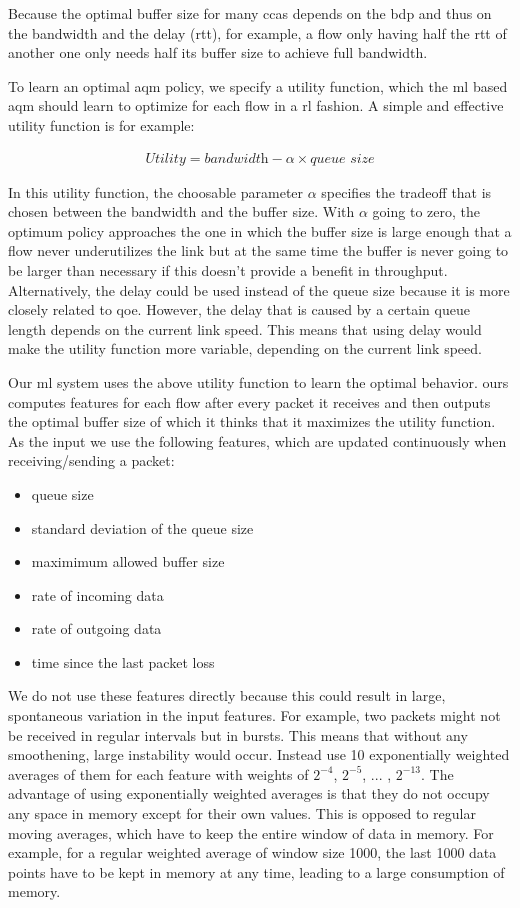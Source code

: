 \documentclass[conference]{IEEEtran}
\begin{document}
Because the optimal buffer size for many \glspl{cca} depends on the \gls{bdp} and thus on the bandwidth and the delay (\gls{rtt}), for example, a flow only having half the \gls{rtt} of another one only needs half its buffer size to achieve full bandwidth. 

To learn an optimal \gls{aqm} policy, we specify a utility function, which the \gls{ml} based \gls{aqm} should learn to optimize for each flow in a \gls{rl} fashion. A simple and effective utility function is for example:

\begin{align}
\textit{Utility} = \textit{bandwidth}-\alpha\times\textit{queue size}
\label{eq:utility}
\end{align}

In this utility function, the choosable parameter $\alpha$ specifies the tradeoff that is chosen between the bandwidth and the buffer size. With $\alpha$ going to zero, the optimum policy approaches the one in which the buffer size is large enough that a flow never underutilizes the link but at the same time the buffer is never going to be larger than necessary if this doesn't provide a benefit in throughput. Alternatively, the delay could be used instead of the queue size because it is more closely related to \gls{qoe}. However, the delay that is caused by a certain queue length depends on the current link speed. This means that using delay would make the utility function more variable, depending on the current link speed. 

Our \gls{ml} system uses the above utility function to learn the optimal behavior. \gls{ours} computes features for each flow after every packet it receives and then outputs the optimal buffer size of which it thinks that it maximizes the utility function. As the input we use the following features, which are updated continuously when receiving/sending a packet: 
\begin{itemize}
\item queue size
\item standard deviation of the queue size 
\item maximimum allowed buffer size
\item rate of incoming data
\item rate of outgoing data
\item time since the last packet loss
\end{itemize}
We do not use these features directly because this could result in large, spontaneous variation in the input features. For example, two packets might not be received in regular intervals but in bursts. This means that without any smoothening, large instability would occur. Instead use 10 exponentially weighted averages of them for each feature with weights of $2^{-4}$, $2^{-5}$, ... , $2^{-13}$. The advantage of using exponentially weighted averages is that they do not occupy any space in memory except for their own values. This is opposed to regular moving averages, which have to keep the entire window of data in memory. For example, for a regular weighted average of window size 1000, the last 1000 data points have to be kept in memory at any time, leading to a large consumption of memory. 
\end{document}
